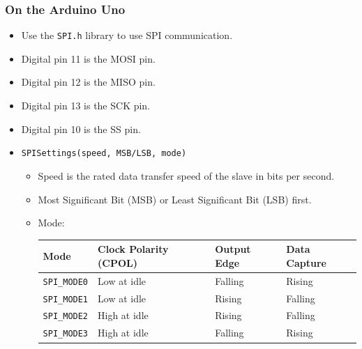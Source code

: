\documentclass[11pt]{article}
\begin{document}
\subsubsection{On the Arduino Uno}
\label{sec:org4940a3d}
\begin{itemize}
\item Use the \texttt{SPI.h} library to use SPI communication.
\item Digital pin 11 is the MOSI pin.
\item Digital pin 12 is the MISO pin.
\item Digital pin 13 is the SCK pin.
\item Digital pin 10 is the SS pin.
\item \texttt{SPISettings(speed, MSB/LSB, mode)}
\begin{itemize}
\item Speed is the rated data transfer speed of the slave in bits per second.
\item Most Significant Bit (MSB) or Least Significant Bit (LSB) first.
\item Mode:
\begin{center}
\begin{tabular}{llll}
Mode & Clock Polarity (CPOL) & Output Edge & Data Capture\\[0pt]
\hline
\texttt{SPI\_MODE0} & Low at idle & Falling & Rising\\[0pt]
\texttt{SPI\_MODE1} & Low at idle & Rising & Falling\\[0pt]
\texttt{SPI\_MODE2} & High at idle & Rising & Falling\\[0pt]
\texttt{SPI\_MODE3} & High at idle & Falling & Rising\\[0pt]
\end{tabular}
\end{center}
\end{itemize}
\end{itemize}
\end{document}
